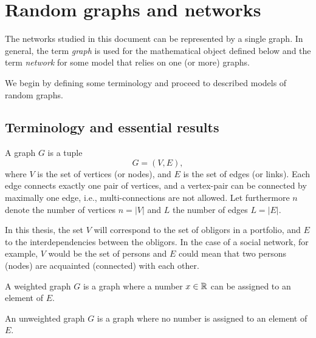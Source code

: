 \chapter{Random graphs and networks} %
\label{cha:graphs_and_networks}



The networks studied in this document can be represented by a single graph.
In general, the term \textit{graph} is used for the mathematical object defined below and the term \textit{network} for some model that relies on one (or more) graphs.

We begin by defining some terminology and proceed to described models of random graphs.

\section{Terminology and essential results} %
\label{sec:definitions_and_essential_results}

\begin{definition}A graph $G$ is a tuple
\begin{equation}
G = (V,E),
\end{equation}
\noindent where $V$ is the set of vertices (or nodes), and $E$ is the set of edges (or links).
Each edge connects exactly one pair of vertices, and a vertex-pair can be connected by maximally one edge, i.e., multi-connections are not allowed.
Let furthermore $n$ denote the number of vertices $n = |V|$ and $L$ the number of edges $L = |E|$.
\end{definition}


In this thesis, the set $V$ will correspond to the set of obligors in a portfolio, and $E$ to the interdependencies between the obligors.
In the case of a social network, for example, $V$ would be the set of persons and $E$ could mean that two persons (nodes) are acquainted (connected) with each other.

\begin{definition}A weighted graph $G$ is a graph where a number $x \in {\mathbb R}$ can be assigned to an element of $E$.\end{definition}

\begin{definition}An unweighted graph $G$ is a graph where no number is assigned to an element of $E$.\end{definition}


